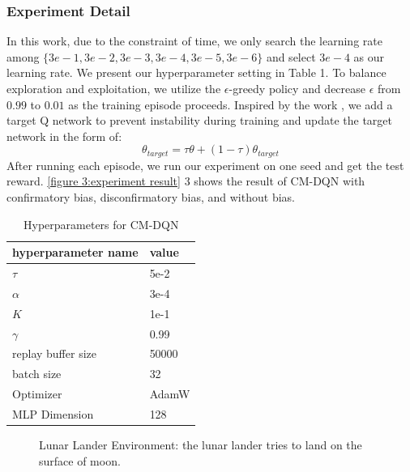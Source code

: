 \documentclass[10pt,letterpaper]{article}
\begin{document}
\subsubsection{Experiment Detail}

In this work, due to the constraint of time, we only search the learning rate among $\{3e-1,3e-2,3e-3,3e-4,3e-5,3e-6\}$ and select $3e-4$ as our learning rate. We present our hyperparameter setting in Table 1. To balance exploration and exploitation, we utilize the $\epsilon$-greedy policy and decrease $\epsilon$ from $0.99$ to $0.01$ as the training episode proceeds.
Inspired by the work \cite{lv2019stochastic}, we add a target Q network to prevent instability during training and update the target network in the form of: \begin{equation*}
    \theta_{target} = \tau \theta + (1-\tau) \theta_{target}
\end{equation*}
After running each episode, we run our experiment on one seed and get the test reward. \autoref{figure 3:experiment result} 3 shows the result of CM-DQN with confirmatory bias, disconfirmatory bias, and without bias.


\begin{table}[H]
\begin{center} 
\caption{Hyperparameters for CM-DQN} 
\label{sample-table} 
\vskip 0.12in
\begin{tabular}{ll} 
\hline
hyperparameter name    &  value \\
\hline
$\tau$        &  5e-2 \\
$\alpha$   &   3e-4 \\
$K$           &   1e-1 \\
$\gamma$        &   0.99 \\
replay buffer size  & 50000 \\
batch size   & 32 \\
Optimizer   & AdamW \\
MLP Dimension & 128 \\
\hline
\end{tabular} 
\end{center} 
\end{table}

\begin{figure}[tp]
\label{figure:Lunar lander}
\begin{center}
\end{center}
\caption{Lunar Lander Environment: the lunar lander tries to land on the surface of moon.} 
\label{sample-figure}
\end{figure}
\end{document}
